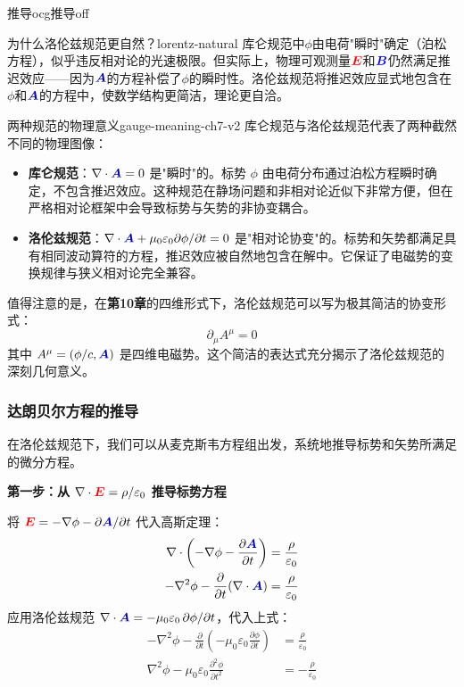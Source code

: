\documentclass[11pt,a4paper,openany,oneside]{book}
\newcommand{\vecE}{\textcolor{red}{\vect{E}}}
\newcommand{\vecB}{\textcolor{blue}{\vect{B}}}
\newcommand{\vecA}{\textcolor{blue!70!black}{\vect{A}}}
\newcommand{\eps}{\varepsilon}
\newcommand{\muz}{\mu_0}
\newcommand{\vect}[1]{\bm{#1}}
\newcommand{\grad}{\nabla}
\newcommand{\divg}{\nabla\cdot}
\newcommand{\lap}{\nabla^2}
\begin{document}
\begin{ocg}{推导}{ocg推导}{off}
\begin{insight}{为什么洛伦兹规范更自然？}{lorentz-natural}
库仑规范中$\phi$由电荷"瞬时"确定（泊松方程），似乎违反相对论的光速极限。但实际上，物理可观测量$\vecE$和$\vecB$仍然满足推迟效应——因为$\vecA$的方程补偿了$\phi$的瞬时性。洛伦兹规范将推迟效应显式地包含在$\phi$和$\vecA$的方程中，使数学结构更简洁，理论更自洽。
\end{insight}


\begin{insight}{两种规范的物理意义}{gauge-meaning-ch7-v2}
库仑规范与洛伦兹规范代表了两种截然不同的物理图像：
\begin{itemize}
\item \textbf{库仑规范}：$\nabla\cdot\vecA=0$ 是"瞬时"的。标势 $\phi$ 由电荷分布通过泊松方程瞬时确定，不包含推迟效应。这种规范在静场问题和非相对论近似下非常方便，但在严格相对论框架中会导致标势与矢势的非协变耦合。
\item \textbf{洛伦兹规范}：$\nabla\cdot\vecA + \muz\eps_0\partial\phi/\partial t = 0$ 是"相对论协变"的。标势和矢势都满足具有相同波动算符的方程，推迟效应被自然地包含在解中。它保证了电磁势的变换规律与狭义相对论完全兼容。
\end{itemize}

值得注意的是，在\textbf{第10章}的四维形式下，洛伦兹规范可以写为极其简洁的协变形式：
\[
\partial_\mu A^\mu = 0
\]
其中 $A^\mu = (\phi/c, \vecA)$ 是四维电磁势。这个简洁的表达式充分揭示了洛伦兹规范的深刻几何意义。
\end{insight}

\subsubsection{达朗贝尔方程的推导}

在洛伦兹规范下，我们可以从麦克斯韦方程组出发，系统地推导标势和矢势所满足的微分方程。

\textbf{第一步：从 $\divg\vecE = \rho/\eps_0$ 推导标势方程}

将 $\vecE = -\grad\phi - \partial\vecA/\partial t$ 代入高斯定理：
\begin{align*}
\divg\left(-\grad\phi - \frac{\partial\vecA}{\partial t}\right) &= \frac{\rho}{\eps_0} \\
-\lap\phi - \frac{\partial}{\partial t}(\nabla\cdot\vecA) &= \frac{\rho}{\eps_0}
\end{align*}
应用洛伦兹规范 $\nabla\cdot\vecA = -\muz\eps_0\,\partial\phi/\partial t$，代入上式：
\begin{align*}
-\lap\phi - \frac{\partial}{\partial t}\left(-\muz\eps_0\frac{\partial\phi}{\partial t}\right) &= \frac{\rho}{\eps_0} \\
\lap\phi - \muz\eps_0\frac{\partial^2\phi}{\partial t^2} &= -\frac{\rho}{\eps_0}
\end{align*}


\end{ocg}
\end{document}
